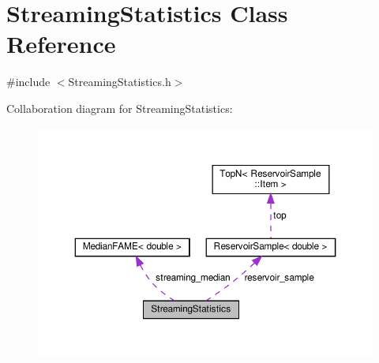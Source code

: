 \hypertarget{class_streaming_statistics}{}\section{Streaming\+Statistics Class Reference}
\label{class_streaming_statistics}


{\ttfamily \#include $<$Streaming\+Statistics.\+h$>$}



Collaboration diagram for Streaming\+Statistics\+:\nopagebreak
\begin{figure}[H]
\begin{center}
\leavevmode
\includegraphics[width=350pt]{class_streaming_statistics__coll__graph}
\end{center}
\end{figure}
